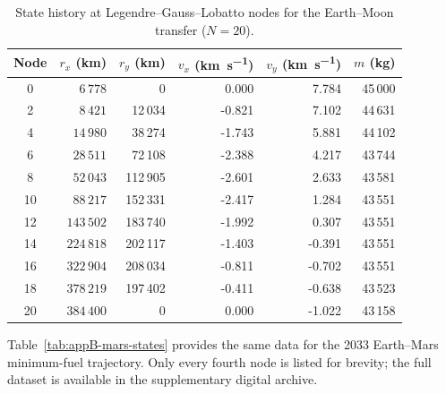 \documentclass[dissertation, bookmarks]{../example/tex/grizz_thesis}
\begin{document}
\begin{table}[htbp]
  \caption{State history at Legendre--Gauss--Lobatto nodes for the Earth--Moon transfer ($N=20$).}
  \label{tab:appB-moon-states}
  \centering
  \begin{tabular}{crrrrr}
    \toprule
    \textbf{Node} & $r_x$ (\si{\kilo\meter}) & $r_y$ (\si{\kilo\meter}) & $v_x$ (\si{\kilo\meter\per\second}) & $v_y$ (\si{\kilo\meter\per\second}) & $m$ (\si{\kilo\gram}) \\
    \midrule
     0 & $6\,778$ &       0 & 0.000 & 7.784 & 45\,000 \\
     2 & $8\,421$ &  12\,034 & -0.821 & 7.102 & 44\,631 \\
     4 & $14\,980$ &  38\,274 & -1.743 & 5.881 & 44\,102 \\
     6 & $28\,511$ &  72\,108 & -2.388 & 4.217 & 43\,744 \\
     8 & $52\,043$ & 112\,905 & -2.601 & 2.633 & 43\,581 \\
    10 & $88\,217$ & 152\,331 & -2.417 & 1.284 & 43\,551 \\
    12 & $143\,502$ & 183\,740 & -1.992 & 0.307 & 43\,551 \\
    14 & $224\,818$ & 202\,117 & -1.403 & -0.391 & 43\,551 \\
    16 & $322\,904$ & 208\,034 & -0.811 & -0.702 & 43\,551 \\
    18 & $378\,219$ & 197\,402 & -0.411 & -0.638 & 43\,523 \\
    20 & $384\,400$ & 0 & 0.000 & -1.022 & 43\,158 \\
    \bottomrule
  \end{tabular}
\end{table}

\blindtext


Table~\ref{tab:appB-mars-states} provides the same data for the 2033 Earth--Mars minimum-fuel
trajectory. Only every fourth node is listed for brevity; the full dataset is available in the
supplementary digital archive.
\end{document}
